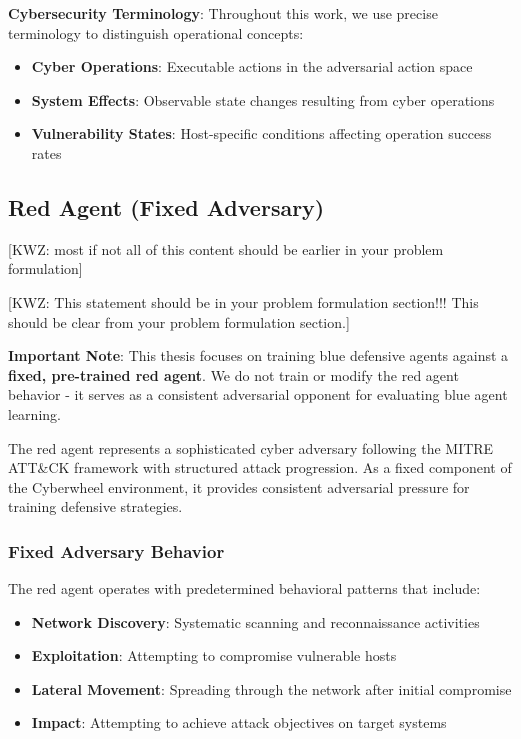 \documentclass[12pt,oneside]{article}
\newcommand{\kwz}[1]{
  {\color{magenta} [KWZ: {#1}]}
 }
\begin{document}
\textbf{Cybersecurity Terminology}: Throughout this work, we use precise terminology to distinguish operational concepts:
\begin{itemize}
\item \textbf{Cyber Operations}: Executable actions in the adversarial action space
\item \textbf{System Effects}: Observable state changes resulting from cyber operations
\item \textbf{Vulnerability States}: Host-specific conditions affecting operation success rates
\end{itemize}

\subsection{Red Agent (Fixed Adversary)}

\kwz{most if not all of this content should be earlier in your problem formulation}

\kwz{This statement should be in your problem formulation section!!! This should be clear from your problem formulation section.}
\textbf{Important Note}: This thesis focuses on training blue defensive agents against a \textbf{fixed, pre-trained red agent}. We do not train or modify the red agent behavior - it serves as a consistent adversarial opponent for evaluating blue agent learning.

The red agent represents a sophisticated cyber adversary following the MITRE ATT\&CK framework with structured attack progression. As a fixed component of the Cyberwheel environment, it provides consistent adversarial pressure for training defensive strategies.

\subsubsection{Fixed Adversary Behavior}
The red agent operates with predetermined behavioral patterns that include:
\begin{itemize}
\item \textbf{Network Discovery}: Systematic scanning and reconnaissance activities
\item \textbf{Exploitation}: Attempting to compromise vulnerable hosts
\item \textbf{Lateral Movement}: Spreading through the network after initial compromise
\item \textbf{Impact}: Attempting to achieve attack objectives on target systems
\end{itemize}
\end{document}
